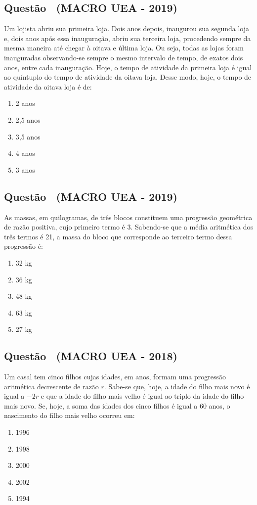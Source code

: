 \documentclass[12pt]{article}
\newcounter{questao}
\newcommand{\novaquestao}[1]{%
  \stepcounter{questao}%
  \subsection*{Questão \thequestao\ (#1)}%
}
\begin{document}
\begin{multicols}{2}
        \novaquestao{MACRO UEA - 2019}
            Um lojista abriu sua primeira loja. Dois anos depois, inaugurou sua segunda loja e, dois anos após essa inauguração, abriu sua terceira loja, procedendo sempre da mesma maneira até chegar à oitava e última loja. Ou seja, todas as lojas foram inauguradas observando-se sempre o mesmo intervalo de tempo, de exatos dois anos, entre cada inauguração. Hoje, o tempo de atividade da primeira loja é igual ao quíntuplo do tempo de atividade da oitava loja. Desse modo, hoje, o tempo de atividade da oitava loja é de:

            \begin{enumerate}[label=(\alph*), noitemsep]
                \item 2 anos
                \item 2,5 anos
                \item 3,5 anos
                \item 4 anos
                \item 3 anos
            \end{enumerate}

        \novaquestao{MACRO UEA - 2019}
            As massas, em quilogramas, de três blocos constituem uma progressão geométrica de razão positiva, cujo primeiro termo é 3. Sabendo-se que a média aritmética dos três termos é 21, a massa do bloco que corresponde ao terceiro termo dessa progressão é:

            \begin{enumerate}[label=(\alph*), noitemsep]
                \item 32 kg
                \item 36 kg
                \item 48 kg
                \item 63 kg
                \item 27 kg
            \end{enumerate}

        \novaquestao{MACRO UEA - 2018}
        
            Um casal tem cinco filhos cujas idades, em anos, formam uma progressão aritmética decrescente de razão $r$. Sabe-se que, hoje, a idade do filho mais novo é igual a $-2r$ e que a idade do filho mais velho é igual ao triplo da idade do filho mais novo. Se, hoje, a soma das idades dos cinco filhos é igual a 60 anos, o nascimento do filho mais velho ocorreu em:
        
    
            \begin{enumerate}[label=(\alph*), noitemsep]
                \item 1996
                \item 1998
                \item 2000
                \item 2002
                \item 1994
            \end{enumerate}


\end{multicols}
\end{document}
